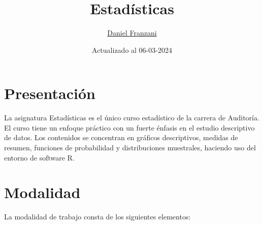 \documentclass[
  11pt,
]{book}
\title{Estadísticas}
\author{\href{https://dfranzani.github.io/website/principal/home.html}{Daniel Franzani}}
\date{Actualizado al 06-03-2024}
\theoremstyle{definition}
\theoremstyle{definition}
\theoremstyle{definition}
\theoremstyle{definition}
\theoremstyle{remark}
\begin{document}
\maketitle

{
\setcounter{tocdepth}{3}
\tableofcontents
}
\chapter*{Presentación}\label{presentaciuxf3n}

La asignatura Estadísticas es el único curso estadístico de la carrera de Auditoría. El curso tiene un enfoque práctico con un fuerte énfasis en el estudio descriptivo de datos. Los contenidos se concentran en gráficos descriptivos, medidas de resumen, funciones de probabilidad y distribuciones muestrales, haciendo uso del entorno de software R.

\chapter*{Modalidad}\label{modalidad}

La modalidad de trabajo consta de los siguientes elementos:
\end{document}

